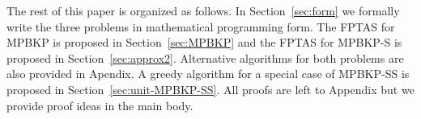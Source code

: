 The rest of this paper is organized as follows. In Section~\ref{sec:form} we formally write the three problems in mathematical programming form. The FPTAS for MPBKP is proposed in Section~\ref{sec:MPBKP} and the FPTAS for MPBKP-S is proposed in Section~\ref{sec:approx2}. Alternative algorithms for both problems are also provided in Apendix. A greedy algorithm for a special case of MPBKP-SS is proposed in Section~\ref{sec:unit-MPBKP-SS}. All proofs are left to Appendix but we provide proof ideas in the main body.